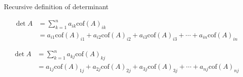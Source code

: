 \documentclass{beamer}
\begin{document}
\begin{frame}{Recursive definition of determinant}
  \begin{definition}
    \begin{align*}
      \det A &= \sum_{k=1}^n a_{ik}\mbox{cof}(A)_{ik}\\
             &=a_{i1} \mbox{cof}(A)_{i1} + a_{i2}\mbox{cof}(A)_{i2} +
      a_{i3}\mbox{cof}(A)_{i3} + \cdots + a_{in}\mbox{cof}(A)_{in}
    \end{align*}
  \end{definition}
  \begin{definition}
    \begin{align*}
      \det A &= \sum_{k=1}^n a_{kj}\mbox{cof}(A)_{kj}\\
             &=a_{1j} \mbox{cof}(A)_{1j} + a_{2j}\mbox{cof}(A)_{2j} +
      a_{3j}\mbox{cof}(A)_{3j} + \cdots + a_{nj}\mbox{cof}(A)_{nj}
    \end{align*}
  \end{definition}
\end{frame}
\end{document}
